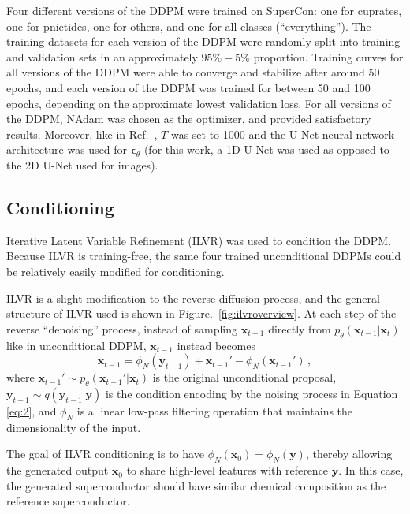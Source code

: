 \documentclass[%
reprint,
 amsmath,amssymb,
 aps,
prb,
]{revtex4-2}
\begin{document}
Four different versions of the DDPM were trained on SuperCon: one for cuprates, one for pnictides, one for others, and one for all classes (``everything''). The training datasets for each version of the DDPM were randomly split into training and validation sets in an approximately $95 \% - 5 \%$ proportion. Training curves for all versions of the DDPM were able to converge and stabilize after around 50 epochs, and each version of the DDPM was trained for between 50 and 100 epochs, depending on the approximate lowest validation loss. For all versions of the DDPM, NAdam \cite{dozat.2016} was chosen as the optimizer, and provided satisfactory results. Moreover, like in Ref.~\cite{ho2020denoising}, $T$ was set to 1000 and the U-Net \cite{10.1007/978-3-319-24574-4_28} neural network architecture was used for $\bm{\epsilon}_{\theta}$ (for this work, a 1D U-Net was used as opposed to the 2D U-Net used for images).


\subsection{Conditioning}
\label{sec:ilvr}



Iterative Latent Variable Refinement (ILVR) \cite{choi2021ilvr} was used to condition the DDPM. Because ILVR is training-free, the same four trained unconditional DDPMs could be relatively easily modified for conditioning.

ILVR is a slight modification to the reverse diffusion process, and the general structure of ILVR used is shown in Figure.~\ref{fig:ilvroverview}. At each step of the reverse ``denoising'' process, instead of sampling $\mathbf{x}_{t-1}$ directly from $p_{\theta}(\mathbf{x}_{t-1}|\mathbf{x}_t)$ like in unconditional DDPM, $\mathbf{x}_{t-1}$ instead becomes
\begin{equation}
    \mathbf{x}_{t-1} = \phi_{N}(\mathbf{y}_{t-1}) + \mathbf{x}_{t-1}' - \phi_{N}(\mathbf{x}_{t-1}')\, ,
\end{equation}
where $\mathbf{x}_{t-1}' \sim p_{\theta}(\mathbf{x}_{t-1}' | \mathbf{x}_t)$ is the original unconditional proposal, $\mathbf{y}_{t-1} \sim q(\mathbf{y}_{t-1} | \mathbf{y})$ is the condition encoding by the noising process in Equation \eqref{eq:2}, and $\phi_N$ is a linear low-pass filtering operation that maintains the dimensionality of the input.

The goal of ILVR conditioning is to have $\phi_{N}(\mathbf{x}_{0}) = \phi_{N}(\mathbf{y})$, thereby allowing the generated output $\mathbf{x}_0$ to share high-level features with reference $\mathbf{y}$. In this case, the generated superconductor should have similar chemical composition as the reference superconductor.
\end{document}
